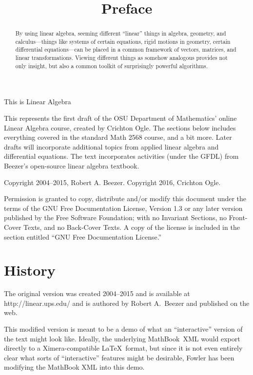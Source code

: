 \documentclass{ximera}
\title{Preface}
\begin{document}
\begin{abstract}
  By using linear algebra, seeming different ``linear'' things in
  algebra, geometry, and calculus—things like systems of certain
  equations, rigid motions in geometry, certain differential
  equations—can be placed in a common framework of vectors, matrices,
  and linear transformations.  Viewing different things as somehow
  analogous provides not only insight, but also a common toolkit of
  surprisingly powerful algorithms.
\end{abstract}
\maketitle

\begin{center}
\Huge This is Linear Algebra
\end{center}

This represents the first draft of the OSU Department of Mathematics'
online Linear Algebra course, created by Crichton Ogle. The sections
below includes everything covered in the standard Math 2568 course,
and a bit more. Later drafts will incorporate additional topics from
applied linear algebra and differential equations.  The text
incorporates activities (under the GFDL) from Beezer's open-source
linear algebra textbook.

Copyright 2004--2015, Robert A. Beezer.  Copyright 2016, Crichton Ogle.

Permission is granted to copy, distribute and/or modify this document
under the terms of the GNU Free Documentation License, Version 1.3 or
any later version published by the Free Software Foundation; with no
Invariant Sections, no Front-Cover Texts, and no Back-Cover Texts.  A
copy of the license is included in the section entitled ``GNU Free
Documentation License.''

\section{History}   

The original version was created 2004--2015 and is available at
http://linear.ups.edu/ and is authored by Robert A.~Beezer and
published on the web.

This modified version is meant to be a demo of what an ``interactive''
version of the text might look like.  Ideally, the underlying
MathBook~XML would export directly to a Ximera-compatible \LaTeX\
format, but since it is not even entirely clear what sorts of
``interactive'' features might be desirable, Fowler has been modifying
the MathBook XML into this demo.
\end{document}

